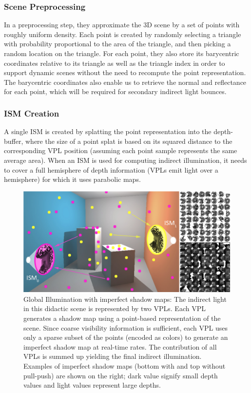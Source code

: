 \subsubsection{Scene Preprocessing}
In a preprocessing step, they approximate the 3D scene by a set of points with roughly uniform density. Each point is created by randomly selecting a triangle with probability proportional to the area of the triangle, and then picking a random location on the triangle. For each point, they also store its barycentric coordinates relative to its triangle as well as the triangle index in order to support dynamic scenes without the need to recompute the point representation. The barycentric coordinates also enable us to retrieve the normal and reflectance for each point, which will be required for secondary indirect light bounces.



\subsubsection{ISM Creation}
A single ISM is created by splatting the point representation into the depth-buffer, where the size of a point splat is based on its squared distance to the corresponding VPL position (assuming each point sample represents the same average area). When an ISM is used for computing indirect illumination, it needs to cover a full hemisphere of depth information (VPLs emit light over a hemisphere) for which it uses parabolic maps.

\begin{figure}\label{f:imperfect-shadow-maps-2}
	\begin{center}
		\includegraphics[width=1.\textwidth]{graphics/ir/ir-4-2}
	\end{center}
	\caption{Global Illumination with imperfect shadow maps: The indirect light in this didactic scene is represented by two VPLs. Each VPL generates a shadow map using a point-based representation of the scene. Since coarse visibility information is sufficient, each VPL uses only a sparse subset of the points (encoded as colors) to generate an imperfect shadow map at real-time rates. The contribution of all VPLs is summed up yielding the final indirect illumination. Examples of imperfect shadow maps (bottom with and top without pull-push) are shown on the right; dark value signify small depth values and light values represent large depths.}
\end{figure}

